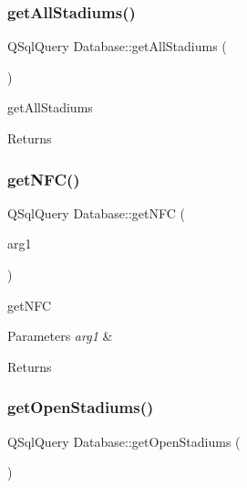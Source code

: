 \subsubsection{\texorpdfstring{get\+All\+Stadiums()}{getAllStadiums()}}
{\footnotesize\ttfamily Q\+Sql\+Query Database\+::get\+All\+Stadiums (\begin{DoxyParamCaption}{ }\end{DoxyParamCaption})}



get\+All\+Stadiums 

\begin{DoxyReturn}{Returns}

\end{DoxyReturn}
\mbox{\label{class_database_a7e2501d41331a1829a13349256cb1cda}} 
\subsubsection{\texorpdfstring{get\+N\+F\+C()}{getNFC()}}
{\footnotesize\ttfamily Q\+Sql\+Query Database\+::get\+N\+FC (\begin{DoxyParamCaption}\item[{const Q\+String \&}]{arg1 }\end{DoxyParamCaption})}



get\+N\+FC 


\begin{DoxyParams}{Parameters}
{\em arg1} & \\
\hline
\end{DoxyParams}
\begin{DoxyReturn}{Returns}

\end{DoxyReturn}
\mbox{\label{class_database_a19033eeb6c069ffb365f06da4a7b9b5e}} 
\subsubsection{\texorpdfstring{get\+Open\+Stadiums()}{getOpenStadiums()}}
{\footnotesize\ttfamily Q\+Sql\+Query Database\+::get\+Open\+Stadiums (\begin{DoxyParamCaption}{ }\end{DoxyParamCaption})}




